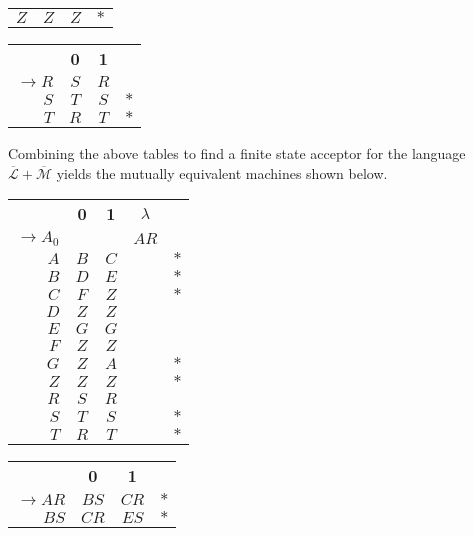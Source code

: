 \documentclass[a4paper,11pt]{article}
\begin{document}
\begin{enumerate}
\begin{center}
\begin{tabular}{r|c|c|l}
				$Z$	 	 & $Z$ & $Z$ & $\ast$ \\ \cline{2-3}
			\end{tabular}
			\qquad
			\begin{tabular}{r|c|c|l}
				\cline{2-3}
				& {\bf 0} & {\bf 1} & \\ \cline{2-3}
				$\to R$	 & $S$ & $R$ &        \\ \cline{2-3}
				$S$	 	 & $T$ & $S$ & $\ast$ \\ \cline{2-3}
				$T$	 	 & $R$ & $T$ & $\ast$ \\ \cline{2-3}
			\end{tabular}
		\end{center}
		Combining the above tables to find a finite state acceptor for the language $\overline{\mathcal{L}} + \overline{\mathcal{M}}$ yields the mutually equivalent machines shown below.
		\begin{center}
			\begin{tabular}{r|c|c|c|l}
				\cline{2-4}
				& {\bf 0}& {\bf 1} & $\lambda$ & \\ \cline{2-4}
				$\to A_0$&	   &	 & $AR$  &        \\ \cline{2-4}
				$A$	 	 & $B$ & $C$ &       & $\ast$ \\ \cline{2-4}
				$B$	 	 & $D$ & $E$ &       & $\ast$ \\ \cline{2-4}
				$C$	 	 & $F$ & $Z$ &       & $\ast$ \\ \cline{2-4}
				$D$	 	 & $Z$ & $Z$ &       &        \\ \cline{2-4}
				$E$	 	 & $G$ & $G$ &       &        \\ \cline{2-4}
				$F$	 	 & $Z$ & $Z$ &       &        \\ \cline{2-4}
				$G$	 	 & $Z$ & $A$ &       & $\ast$ \\ \cline{2-4}
				$Z$	 	 & $Z$ & $Z$ &       & $\ast$ \\ \cline{2-4}
				$R$  	 & $S$ & $R$ &       &        \\ \cline{2-4}
				$S$	 	 & $T$ & $S$ &       & $\ast$ \\ \cline{2-4}
				$T$	 	 & $R$ & $T$ &       & $\ast$ \\ \cline{2-4}
			\end{tabular}
			\qquad
			\begin{tabular}{r|c|c|l}
				\cline{2-3}
				& {\bf 0}& {\bf 1} & \\ \cline{2-3}
				$\to AR$ & $BS$ & $CR$ & $\ast$ \\ \cline{2-3}
				$BS$	 & $CR$ & $ES$ & $\ast$ \\ \cline{2-3}

\end{tabular}
\end{center}
\end{enumerate}
\end{document}
